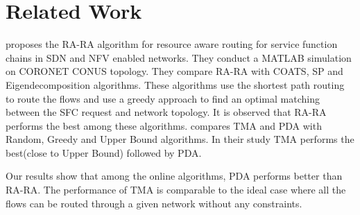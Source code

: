 \section{Related Work}
\label{sec:relatedwork}
\cite{ref:paper2} proposes the RA-RA algorithm for resource aware routing for service function chains in SDN and NFV enabled networks. They conduct a MATLAB simulation on CORONET CONUS topology. They compare RA-RA with COATS, SP and Eigendecomposition algorithms. These algorithms use the shortest path routing to route the flows and use a greedy approach to find an optimal matching between the SFC request and network topology. It is observed that RA-RA performs the best among these algorithms. \cite{ref:paper1} compares TMA and PDA with Random, Greedy and Upper Bound algorithms. In their study TMA performs the best(close to Upper Bound) followed by PDA.

Our results show that among the online algorithms, PDA performs better than RA-RA. The performance of TMA is comparable to the ideal case where all the flows can be routed through a given network without any constraints. 